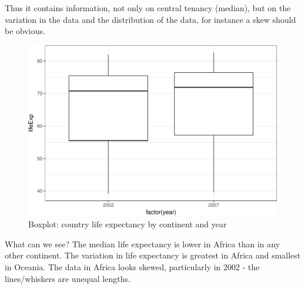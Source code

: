 \documentclass[12pt,]{krantz}
\makeatletter
\newenvironment{Shaded}{\begin{snugshade}}{\end{snugshade}}
\newcommand{\CommentTok}[1]{\textcolor[rgb]{0.56,0.35,0.01}{\textit{#1}}}
\newcommand{\DataTypeTok}[1]{\textcolor[rgb]{0.13,0.29,0.53}{#1}}
\newcommand{\DecValTok}[1]{\textcolor[rgb]{0.00,0.00,0.81}{#1}}
\newcommand{\KeywordTok}[1]{\textcolor[rgb]{0.13,0.29,0.53}{\textbf{#1}}}
\newcommand{\NormalTok}[1]{#1}
\newcommand{\OperatorTok}[1]{\textcolor[rgb]{0.81,0.36,0.00}{\textbf{#1}}}
\newcommand{\StringTok}[1]{\textcolor[rgb]{0.31,0.60,0.02}{#1}}
\newenvironment{kframe}{%
\medskip{}
\setlength{\fboxsep}{.8em}
 \def\at@end@of@kframe{}%
 \ifinner\ifhmode%
  \def\at@end@of@kframe{\end{minipage}}%
  \begin{minipage}{\columnwidth}%
 \fi\fi%
 \def\FrameCommand##1{\hskip\@totalleftmargin \hskip-\fboxsep
 \colorbox{shadecolor}{##1}\hskip-\fboxsep
     \hskip-\linewidth \hskip-\@totalleftmargin \hskip\columnwidth}%
 \MakeFramed {\advance\hsize-\width
   \@totalleftmargin\z@ \linewidth\hsize
   \@setminipage}}%
 {\par\unskip\endMakeFramed%
 \at@end@of@kframe}
\renewenvironment{Shaded}{\begin{kframe}}{\end{kframe}}
\theoremstyle{definition}
\theoremstyle{definition}
\theoremstyle{definition}
\theoremstyle{remark}
\makeatother
\begin{document}
Thus it contains information, not only on central tenancy (median), but
on the variation in the data and the distribution of the data, for
instance a skew should be obvious.

\begin{Shaded}
\end{Shaded}

\begin{figure}
\centering
\includegraphics{06_tests_continuous_files/figure-latex/unnamed-chunk-6-1.pdf}
\caption{\label{fig:unnamed-chunk-6}Boxplot: country life expectancy by
continent and year}
\end{figure}

 

What can we see? The median life expectancy is lower in Africa than in
any other continent. The variation in life expectancy is greatest in
Africa and smallest in Oceania. The data in Africa looks skewed,
particularly in 2002 - the lines/whiskers are unequal lengths.
\end{document}
